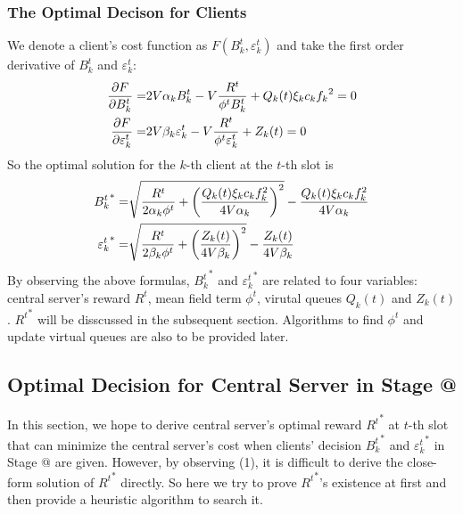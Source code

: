 \documentclass[conference]{IEEEtran}
\makeatletter
\newcommand{\Rmnum}[1]{\expandafter\@slowromancap\romannumeral #1@}
\makeatother
\begin{document}
\subsubsection{The Optimal Decison for Clients}
We denote a client's cost function as $F(B_k^t, \varepsilon_k^t)$ and take the first order derivative of $B_k^t$ and $\varepsilon_k^t$:
\begin{alignat}{2}
    {\partial{F} \over \partial{B_k^t}} = & 2V\alpha_kB_k^t - V{R^t \over \phi^tB_k^t} + Q_k(t)\xi_kc_k{f_k}^2 = 0 \\
    {\partial{F} \over \partial{\varepsilon_k^t}} = & 2V\beta_k\varepsilon_k^t - V{R^t \over \phi^t\varepsilon_k^t} + Z_k(t) = 0
\end{alignat} 
So the optimal solution for the $k$-th client at the $t$-th slot is
\begin{alignat}{2}
    {B_k^t}^* = & \sqrt{{{R^t \over 2\alpha_k\phi^t} + \left({Q_k(t)\xi_kc_kf_k^2 \over 4V\alpha_k}\right)^2}} - {Q_k(t)\xi_kc_kf_k^2 \over 4V\alpha_k} \\
    {\varepsilon_k^t}^* = & \sqrt{{R^t \over 2\beta_k\phi^t} + \left({Z_k(t) \over 4V\beta_k}\right)^2} - {Z_k(t) \over 4V\beta_k}
\end{alignat}
By observing the above formulas, ${B_k^t}^*$ and ${\varepsilon_k^t}^*$ are related to four variables: central server's reward $R^t$, mean field term $\phi^t$, virutal queues $Q_k(t)$ and $Z_k(t)$.
${R^t}^*$ will be disscussed in the subsequent section. Algorithms to find $\phi^t$ and update virtual queues are also to be provided later.

\subsection{Optimal Decision for Central Server in Stage \Rmnum{1}}
In this section, we hope to derive central server's optimal reward ${R^t}^*$ at $t$-th slot that can minimize the central server's cost when clients' decision ${B_k^t}^*$ and ${\varepsilon_k^t}^*$ in Stage \Rmnum{2} are given.
However, by observing (1), it is difficult to derive the close-form solution of ${R^t}^*$ directly.
So here we try to prove ${R^t}^*$'s existence at first and then provide a heuristic algorithm to search it.
\end{document}
